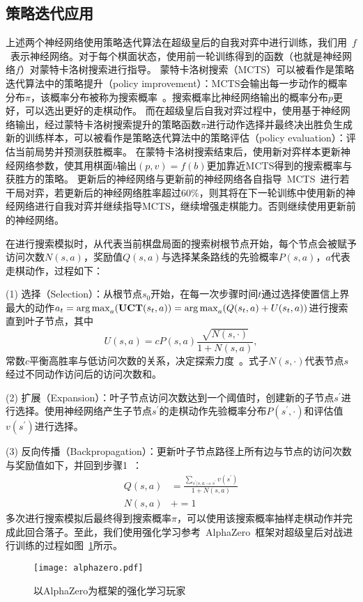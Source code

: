 \subsection{策略迭代应用}
上述两个神经网络使用策略迭代算法在超级皇后的自我对弈中进行训练，我们用~$f$~表示神经网络。对于每个棋面状态，使用前一轮训练得到的函数（也就是神经网络$f$）对蒙特卡洛树搜索进行指导。
蒙特卡洛树搜索（MCTS）可以被看作是策略迭代算法中的策略提升（policy improvement）：MCTS会输出每一步动作的概率分布$\pi$，该概率分布被称为搜索概率~\cite{silver2009reinforcement}。搜索概率比神经网络输出的概率分布$p$更好，可以选出更好的走棋动作。
而在超级皇后自我对弈过程中，使用基于神经网络输出，经过蒙特卡洛树搜索提升的策略函数$\pi$进行动作选择并最终决出胜负生成新的训练样本，可以被看作是策略迭代算法中的策略评估（policy evaluation）：评估当前局势并预测获胜概率。
在蒙特卡洛树搜索结束后，使用新对弈样本更新神经网络参数，使其用棋面$b$输出$(p,v)=f(b)$更加靠近MCTS得到的搜索概率与获胜方的策略。
更新后的神经网络与更新前的神经网络各自指导~MCTS~进行若干局对弈，若更新后的神经网络胜率超过$60\%$，则其将在下一轮训练中使用新的神经网络进行自我对弈并继续指导MCTS，继续增强走棋能力。否则继续使用更新前的神经网络。

在进行搜索模拟时，从代表当前棋盘局面的搜索树根节点开始，每个节点会被赋予访问次数$N(s,a)$，奖励值$Q(s,a)$与选择某条路线的先验概率$P(s,a)$，$a$代表走棋动作，过程如下：

(1) 选择（Selection）：从根节点$s_{0}$开始，在每一次步骤时间$t$通过选择使置信上界最大的动作$a_{t} =  \mathop{\operatorname*{\arg\max}}_{a} (\textbf{UCT}(s_{t},a)) =  \mathop{\operatorname*{\arg\max}}_{a} (Q(s_{t},a) + U(s_{t},a))$进行搜索直到叶子节点，其中
\begin{equation*}
    U(s,a) = cP(s,a)\frac{\sqrt{N(s,\cdot)}}{1+N(s,a)},
\end{equation*}
常数$c$平衡高胜率与低访问次数的关系，决定探索力度~\cite{rosin2011multi}。式子$N(s,\cdot)$代表节点$s$经过不同动作访问后的访问次数和。

(2) 扩展（Expansion）：叶子节点访问次数达到一个阈值时，创建新的子节点$s^{\prime}$进行选择。使用神经网络产生子节点$s^{\prime}$的走棋动作先验概率分布$P(s^{\prime},\cdot)$和评估值$v(s^{\prime})$进行选择。

(3) 反向传播（Backpropagation）：更新叶子节点路径上所有边与节点的访问次数与奖励值如下，并回到步骤1~\cite{segal2010scalability}：
\begin{equation*}
    \begin{aligned}
    Q(s,a) &= \frac{\sum_{s^{\prime}|s,a\rightarrow s^{\prime}}v(s^{\prime})}{1+N(s,a)} \\
    N(s,a) &+= 1 
    \end{aligned}
\end{equation*}
多次进行搜索模拟后最终得到搜索概率$\pi$，可以使用该搜索概率抽样走棋动作并完成此回合落子。至此，我们使用强化学习参考~AlphaZero~框架对超级皇后对战进行训练的过程如图~\ref{fig:az}所示。
\begin{figure}[!tb]
    \centering
    \texttt{[image: alphazero.pdf]}
    \caption[az]{%
    以AlphaZero为框架的强化学习玩家~\cite{Silver2017}%
      }
    \label{fig:az}
\end{figure}


